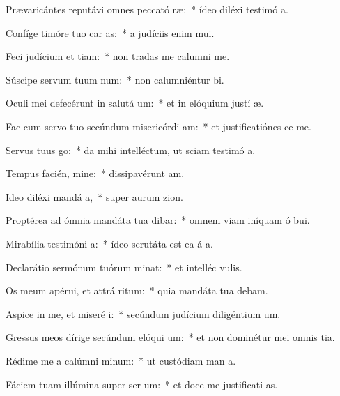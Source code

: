 \item Prævaricántes reputávi omnes peccató ræ:~* ídeo diléxi testimó a.
\item Confíge timóre tuo car as:~* a judíciis enim  mui.
\item Feci judícium et tiam:~* non tradas me calumni me.
\item Súscipe servum tuum  num:~* non calumniéntur  bi.
\item Oculi mei defecérunt in salutá um:~* et in elóquium justí æ.
\item Fac cum servo tuo secúndum misericórdi am:~* et justificatiónes  ce me.
\item Servus tuus  go:~* da mihi intelléctum, ut sciam testimó a.
\item Tempus facién, mine:~* dissipavérunt  am.
\item Ideo diléxi mandá a,~* super aurum  zion.
\item Proptérea ad ómnia mandáta tua dibar:~* omnem viam iníquam ó bui.
\item Mirabília testimóni a:~* ídeo scrutáta est ea á a.
\item Declarátio sermónum tuórum minat:~* et intelléc  vulis.
\item Os meum apérui, et attrá ritum:~* quia mandáta tua debam.
\item Aspice in me, et miseré i:~* secúndum judícium diligéntium  um.
\item Gressus meos dírige secúndum elóqui um:~* et non dominétur mei omnis tia.
\item Rédime me a calúmni minum:~* ut custódiam man a.
\item Fáciem tuam illúmina super ser um:~* et doce me justificati as.
